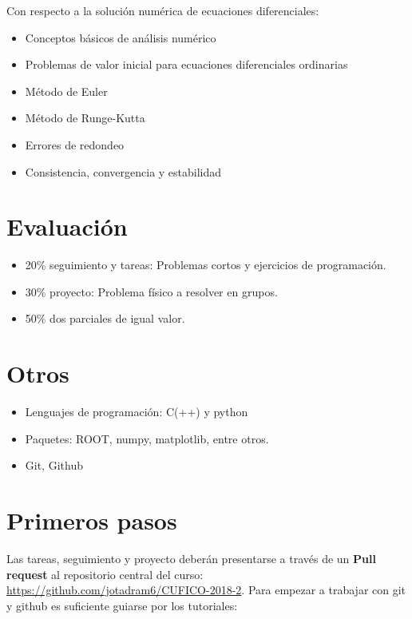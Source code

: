 \documentclass[10.5pt]{article}
\begin{document}
Con respecto a la solución numérica de ecuaciones diferenciales:
\begin{itemize}
\item Conceptos básicos de análisis numérico
\item Problemas de valor inicial para ecuaciones diferenciales ordinarias
\item Método de Euler
\item Método de Runge-Kutta
\item Errores de redondeo
\item Consistencia, convergencia y estabilidad
\end{itemize}

\section{Evaluación}

\begin{itemize}
\item 20\% seguimiento y tareas: Problemas cortos y ejercicios de programación.
\item 30\% proyecto: Problema físico a resolver en grupos.
\item 50\% dos parciales de igual valor. 
\end{itemize}

\section{Otros}

\begin{itemize}
\item Lenguajes de programación: C(++) y python
\item Paquetes: ROOT, numpy, matplotlib, entre otros.
\item Git, Github
\end{itemize}

\section{Primeros pasos}

Las tareas, seguimiento y proyecto deberán presentarse a través de un {\textbf{Pull request}} al repositorio central del curso: \url{https://github.com/jotadram6/CUFICO-2018-2}. Para empezar a trabajar con git y github es suficiente guiarse por los tutoriales:
\end{document}

